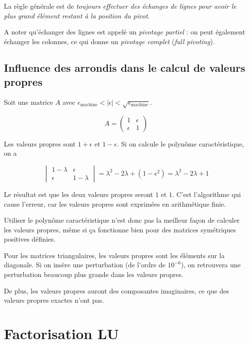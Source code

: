 	La règle générale est de \textit{toujours effectuer des échanges de lignes pour avoir le plus grand élément restant à la position du pivot}.

	A noter qu'échanger des lignes est appelé un \textit{pivotage partiel} : on peut également échanger les colonnes, ce qui donne un \textit{pivotage complet} (\textit{full pivoting}).
	
	\subsection{Influence des arrondis dans le calcul de valeurs propres}
	
	Soit une matrice $A$ avec $\epsilon_{\text{machine}} < \vert \epsilon \vert < \sqrt{\epsilon_{\text{machine}}}$.
	
	$$A = \begin{pmatrix}
1 & \epsilon \\ 
\epsilon & 1
\end{pmatrix} $$

	Les valeurs propres sont $1 + \epsilon$ et $1 - \epsilon$. Si on calcule le polynôme caractéristique, on a
	
	$$\begin{vmatrix}
1 - \lambda & \epsilon \\ 
\epsilon & 1 - \lambda
\end{vmatrix} = \lambda^2 - 2\lambda + (1 - \epsilon^2) = \lambda^2 - 2\lambda + 1 $$

	Le résultat est que les deux valeurs propres seront $1$ et $1$. C'est l'algorithme qui cause l'erreur, car les valeurs propres sont exprimées en arithmétique finie.
	
	Utiliser le polynôme caractéristique n'est donc pas la meilleur façon de calculer les valeurs propres, même si ça fonctionne bien pour des matrices symétriques positives définies.
	
	Pour les matrices triangulaires, les valeurs propres sont les éléments sur la diagonale. Si on insère une perturbation (de l'ordre de $10^{-6}$), on retrouvera une perturbation beaucoup plus grande dans les valeurs propres.
	
	De plus, les valeurs propres auront des composantes imaginaires, ce que des valeurs propres exactes n'ont pas.
		
\section{Factorisation LU}

